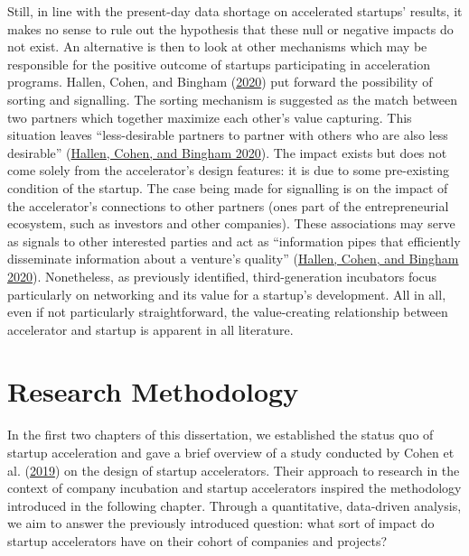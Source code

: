 \documentclass[
  12pt,
]{article}
\begin{document}
Still, in line with the present-day data shortage on accelerated startups' results, it makes no sense to rule out the hypothesis that these null or negative impacts do not exist. An alternative is then to look at other mechanisms which may be responsible for the positive outcome of startups participating in acceleration programs. Hallen, Cohen, and Bingham (\protect\hyperlink{ref-hallen_accelerators_2020}{2020}) put forward the possibility of sorting and signalling. The sorting mechanism is suggested as the match between two partners which together maximize each other's value capturing. This situation leaves ``less-desirable partners to partner with others who are also less desirable'' (\protect\hyperlink{ref-hallen_accelerators_2020}{Hallen, Cohen, and Bingham 2020}). The impact exists but does not come solely from the accelerator's design features: it is due to some pre-existing condition of the startup. The case being made for signalling is on the impact of the accelerator's connections to other partners (ones part of the entrepreneurial ecosystem, such as investors and other companies). These associations may serve as signals to other interested parties and act as ``information pipes that efficiently disseminate information about a venture's quality'' (\protect\hyperlink{ref-hallen_accelerators_2020}{Hallen, Cohen, and Bingham 2020}). Nonetheless, as previously identified, third-generation incubators focus particularly on networking and its value for a startup's development. All in all, even if not particularly straightforward, the value-creating relationship between accelerator and startup is apparent in all literature.

\clearpage

\hypertarget{research-methodology}{%
\section{Research Methodology}\label{research-methodology}}

In the first two chapters of this dissertation, we established the status quo of startup acceleration and gave a brief overview of a study conducted by Cohen et al. (\protect\hyperlink{ref-cohen_design_2019}{2019}) on the design of startup accelerators. Their approach to research in the context of company incubation and startup accelerators inspired the methodology introduced in the following chapter. Through a quantitative, data-driven analysis, we aim to answer the previously introduced question: what sort of impact do startup accelerators have on their cohort of companies and projects?
\end{document}
